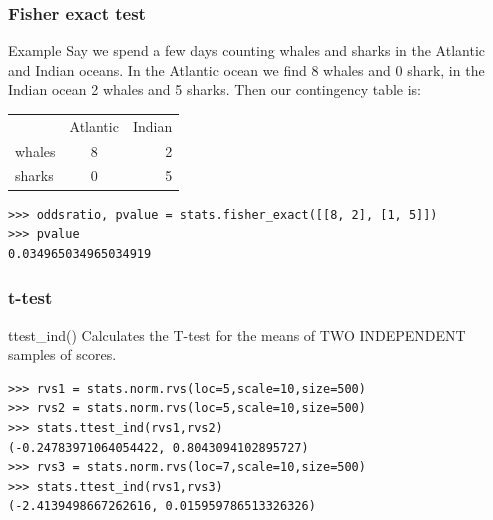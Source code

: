 \documentclass[10pt,colorlinks]{beamer}
\begin{document}
\begin{frame}[fragile]\frametitle{Fisher exact test}
 \begin{block}{Example}
 Say we spend a few days counting whales and sharks in the Atlantic and Indian oceans. In the Atlantic ocean we find 8 whales and 0 shark, in the Indian ocean 2 whales and 5 sharks. Then our contingency table is:
\begin{center}
    
\begin{tabular}{ l c r }
   & Atlantic & Indian \\
  whales & 8 & 2 \\
  sharks & 0 & 5 \\
\end{tabular}
\end{center}
 \end{block}
\begin{verbatim}
>>> oddsratio, pvalue = stats.fisher_exact([[8, 2], [1, 5]])
>>> pvalue
0.034965034965034919
\end{verbatim}

\end{frame}

\begin{frame}[fragile]\frametitle{t-test}
  \begin{block}{ttest\_ind()}
Calculates the T-test for the means of TWO INDEPENDENT samples of scores. 
  \end{block}
\begin{verbatim}
>>> rvs1 = stats.norm.rvs(loc=5,scale=10,size=500)
>>> rvs2 = stats.norm.rvs(loc=5,scale=10,size=500)
>>> stats.ttest_ind(rvs1,rvs2)
(-0.24783971064054422, 0.8043094102895727)
>>> rvs3 = stats.norm.rvs(loc=7,scale=10,size=500)
>>> stats.ttest_ind(rvs1,rvs3)
(-2.4139498667262616, 0.015959786513326326)
\end{verbatim}

\end{frame}
\end{document}
